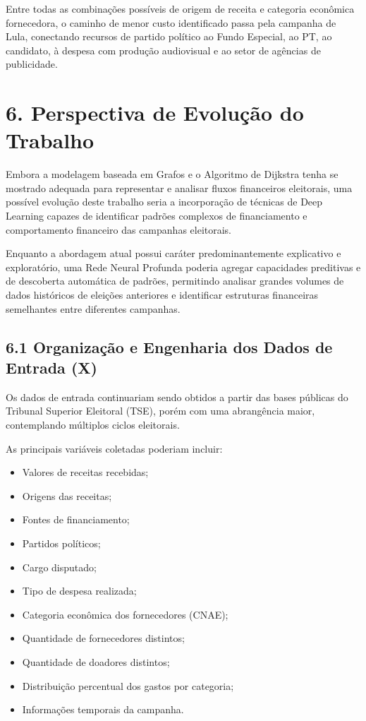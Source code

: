 \documentclass[11pt]{article}
\providecommand{\tightlist}{%
      \setlength{\itemsep}{0pt}\setlength{\parskip}{0pt}}
\begin{document}
    Entre todas as combinações possíveis de origem de receita e categoria
econômica fornecedora, o caminho de menor custo identificado passa pela
campanha de Lula, conectando recursos de partido político ao Fundo
Especial, ao PT, ao candidato, à despesa com produção audiovisual e ao
setor de agências de publicidade.

    \section{6. Perspectiva de Evolução do
Trabalho}\label{perspectiva-de-evoluuxe7uxe3o-do-trabalho}

Embora a modelagem baseada em Grafos e o Algoritmo de Dijkstra tenha se
mostrado adequada para representar e analisar fluxos financeiros
eleitorais, uma possível evolução deste trabalho seria a incorporação de
técnicas de Deep Learning capazes de identificar padrões complexos de
financiamento e comportamento financeiro das campanhas eleitorais.

Enquanto a abordagem atual possui caráter predominantemente explicativo
e exploratório, uma Rede Neural Profunda poderia agregar capacidades
preditivas e de descoberta automática de padrões, permitindo analisar
grandes volumes de dados históricos de eleições anteriores e identificar
estruturas financeiras semelhantes entre diferentes campanhas.

\subsection{6.1 Organização e Engenharia dos Dados de Entrada
(X)}\label{organizauxe7uxe3o-e-engenharia-dos-dados-de-entrada-x}

Os dados de entrada continuariam sendo obtidos a partir das bases
públicas do Tribunal Superior Eleitoral (TSE), porém com uma abrangência
maior, contemplando múltiplos ciclos eleitorais.

As principais variáveis coletadas poderiam incluir:

\begin{itemize}
\tightlist
\item
  Valores de receitas recebidas;
\item
  Origens das receitas;
\item
  Fontes de financiamento;
\item
  Partidos políticos;
\item
  Cargo disputado;
\item
  Tipo de despesa realizada;
\item
  Categoria econômica dos fornecedores (CNAE);
\item
  Quantidade de fornecedores distintos;
\item
  Quantidade de doadores distintos;
\item
  Distribuição percentual dos gastos por categoria;
\item
  Informações temporais da campanha.
\end{itemize}
\end{document}
